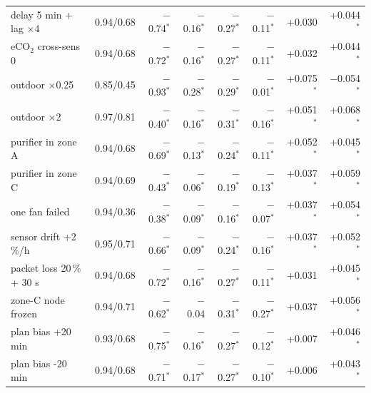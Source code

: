 \begin{tabular}{llrrrrrr}
delay 5 min + lag $\times$4 & 0.94/0.68 & \ensuremath{-}0.74$^*$ & \ensuremath{-}0.16$^*$ & \ensuremath{-}0.27$^*$ & \ensuremath{-}0.11$^*$ & +0.030 & +0.044$^*$\\
eCO$_2$ cross-sens 0 & 0.94/0.68 & \ensuremath{-}0.72$^*$ & \ensuremath{-}0.16$^*$ & \ensuremath{-}0.27$^*$ & \ensuremath{-}0.11$^*$ & +0.032 & +0.044$^*$\\
outdoor $\times$0.25 & 0.85/0.45 & \ensuremath{-}0.93$^*$ & \ensuremath{-}0.28$^*$ & \ensuremath{-}0.29$^*$ & \ensuremath{-}0.01$^*$ & +0.075$^*$ & \ensuremath{-}0.054$^*$\\
outdoor $\times$2 & 0.97/0.81 & \ensuremath{-}0.40$^*$ & \ensuremath{-}0.16$^*$ & \ensuremath{-}0.31$^*$ & \ensuremath{-}0.16$^*$ & +0.051$^*$ & +0.068$^*$\\
purifier in zone A & 0.94/0.68 & \ensuremath{-}0.69$^*$ & \ensuremath{-}0.13$^*$ & \ensuremath{-}0.24$^*$ & \ensuremath{-}0.11$^*$ & +0.052$^*$ & +0.045$^*$\\
purifier in zone C & 0.94/0.69 & \ensuremath{-}0.43$^*$ & \ensuremath{-}0.06$^*$ & \ensuremath{-}0.19$^*$ & \ensuremath{-}0.13$^*$ & +0.037$^*$ & +0.059$^*$\\
one fan failed & 0.94/0.36 & \ensuremath{-}0.38$^*$ & \ensuremath{-}0.09$^*$ & \ensuremath{-}0.16$^*$ & \ensuremath{-}0.07$^*$ & +0.037$^*$ & +0.054$^*$\\
sensor drift +2\,\%/h & 0.95/0.71 & \ensuremath{-}0.66$^*$ & \ensuremath{-}0.09$^*$ & \ensuremath{-}0.24$^*$ & \ensuremath{-}0.16$^*$ & +0.037$^*$ & +0.052$^*$\\
packet loss 20\,\% + 30 s & 0.94/0.68 & \ensuremath{-}0.72$^*$ & \ensuremath{-}0.16$^*$ & \ensuremath{-}0.27$^*$ & \ensuremath{-}0.11$^*$ & +0.031 & +0.045$^*$\\
zone-C node frozen & 0.94/0.71 & \ensuremath{-}0.62$^*$ & \ensuremath{-}0.04 & \ensuremath{-}0.31$^*$ & \ensuremath{-}0.27$^*$ & +0.037 & +0.056$^*$\\
plan bias +20 min & 0.93/0.68 & \ensuremath{-}0.75$^*$ & \ensuremath{-}0.16$^*$ & \ensuremath{-}0.27$^*$ & \ensuremath{-}0.12$^*$ & +0.007 & +0.046$^*$\\
plan bias -20 min & 0.94/0.68 & \ensuremath{-}0.71$^*$ & \ensuremath{-}0.17$^*$ & \ensuremath{-}0.27$^*$ & \ensuremath{-}0.10$^*$ & +0.006 & +0.043$^*$\\
\bottomrule
\end{tabular}
